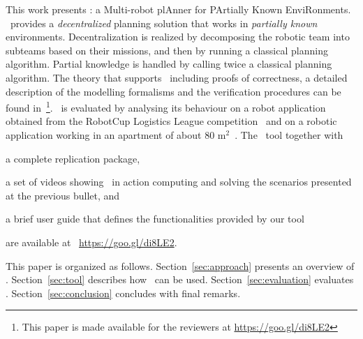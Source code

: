 This work presents  \toolName: a Multi-robot plAnner for PArtially Known EnviRonments.
 \toolName\ provides a  \emph{decentralized} planning solution that works in \emph{partially known} environments.
Decentralization is realized by decomposing the robotic team into subteams based on their missions, and then by running a classical planning algorithm.
Partial knowledge is handled by calling twice a classical planning algorithm.
The theory that supports \toolName\ including proofs of correctness, a detailed description of the modelling formalisms and the verification procedures can be found in~\cite{mapmaker17}\footnote{This paper is made available for the reviewers   at  \url{https://goo.gl/di8LE2}}.
\toolName\ is evaluated by analysing its behaviour on a robot application obtained from the RobotCup Logistics League competition~\cite{karrasrobocup} and on a robotic application working in an apartment of about 80 m$^2$~\cite{map}.
The \toolName\ tool together with 
\begin{enumerate*}
\item a complete replication package,
\item a set of videos showing \toolName\ in action computing and solving the scenarios presented at the previous bullet, and
\item a brief user guide that defines the functionalities provided by our tool
\end{enumerate*}
 are available at ~\url{https://goo.gl/di8LE2}. 

This paper is organized as follows. 
Section~\ref{sec:approach} presents an overview of \toolName.
Section~\ref{sec:tool} describes how  \toolName\ can be used.
Section~\ref{sec:evaluation} evaluates  \toolName.
Section~\ref{sec:conclusion} concludes with final remarks.

